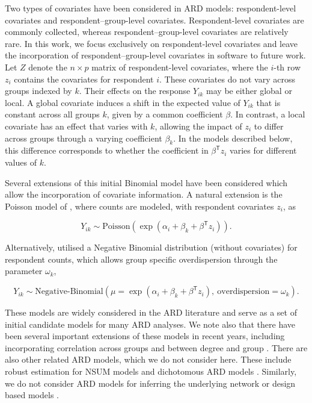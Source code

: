 Two types of covariates have been considered in ARD models: respondent-level
covariates and respondent--group-level covariates. Respondent-level covariates are
commonly collected, whereas respondent--group-level covariates are
relatively rare.
In this work, we focus exclusively on respondent-level covariates and leave the
incorporation of respondent--group-level covariates in software to future work.
Let \(Z\) denote the \(n \times p\) matrix of respondent-level covariates,
where the \(i\)-th row \(z_i\) contains the covariates for respondent \(i\).
These covariates do not vary across groups indexed by \(k\).
Their effects on the response \(Y_{ik}\) may be either global or local.
A global covariate induces a shift in the expected value of \(Y_{ik}\)
that is constant across all groups \(k\), given by a common coefficient \(\beta\).
In contrast, a local covariate has an effect that varies with \(k\),
allowing the impact of \(z_i\) to differ across groups through a varying
coefficient \(\beta_k\).
In the models described below, this difference corresponds to
whether the coefficient in \(\beta^\mathsf{T}z_i\) varies
for different values of \(k\).

Several extensions of this initial Binomial model have been
considered which allow the incorporation of covariate information.
A natural extension is the Poisson model of \citet{teo2019estimating}, where
counts are modeled, with respondent covariates \(z_i\), as

\begin{equation}
Y_{ik} \sim \text{Poisson}(\exp(\alpha_i +\beta_k + \beta^\mathsf{T}z_i)).
\label{eq:pois-cov}
\end{equation}

Alternatively, \citet{zheng2006many} utilised a Negative Binomial distribution
(without covariates)
for respondent counts, which allows group specific overdispersion through the
parameter \(\omega_k\),

\begin{equation}
Y_{ik} \sim \text{Negative-Binomial}(\mu = \exp(\alpha_i +\beta_k + \beta^\mathsf{T}z_i),\ \text{overdispersion}=\omega_k).
\end{equation}

These models are widely considered in the ARD literature and serve as
a set of initial candidate models for many ARD analyses.
We note also that there have been several important extensions
of these models
in recent years, including incorporating correlation across
groups \citep{laga2023correlated} and between degree and
group \citep{vogel2025accounting}.
There are also other related ARD models, which we do not consider here.
These include robust estimation for NSUM models \citep{diaz2026robust} and
dichotomous ARD models \citep{baum2023uses}. Similarly, we do not consider
ARD models for inferring the underlying network \citep[e.g,][]{breza2020using}
or design based models \citep[e.g,][]{feehan2016generalizing}.

